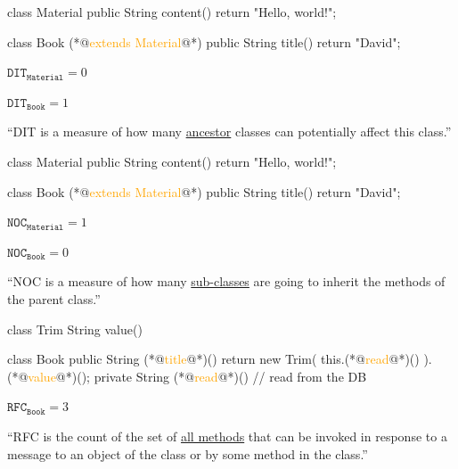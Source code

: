 \documentclass{article}
\begin{document}
\begin{multicols}{2}
{\small\begin{ffcode}
class Material {
  public String content() {
    return "Hello, world!";
  }
}

class Book (*@\textcolor{orange}{extends Material}@*) {
  public String title() {
    return "David";
  }
}
\end{ffcode}
}
\par\columnbreak\par
\(\texttt{DIT}_\texttt{Material} = 0\)\par
\(\texttt{DIT}_\texttt{Book} = 1\)\par
``DIT is a measure of how many \ul{ancestor} classes can potentially affect this class.''
\end{multicols}
\plush{}

\begin{multicols}{2}
{\small\begin{ffcode}
class Material {
  public String content() {
    return "Hello, world!";
  }
}

class Book (*@\textcolor{orange}{extends Material}@*) {
  public String title() {
    return "David";
  }
}
\end{ffcode}
}
\par\columnbreak\par
\(\texttt{NOC}_\texttt{Material} = 1\)\par
\(\texttt{NOC}_\texttt{Book} = 0\)\par
``NOC is a measure of how many \ul{sub-classes} are going to inherit the methods of the parent class.''
\end{multicols}
\plush{}

\begin{multicols}{2}
{\small\begin{ffcode}
class Trim
  String value()

class Book
  public String (*@\textcolor{orange}{title}@*)()
    return new Trim(
      this.(*@\textcolor{orange}{read}@*)()
    ).(*@\textcolor{orange}{value}@*)();
  private String (*@\textcolor{orange}{read}@*)()
    // read from the DB
\end{ffcode}
}
\par\columnbreak\par
\(\texttt{RFC}_\texttt{Book} = 3\)\par
``RFC is the count of the set of \ul{all methods} that can be invoked in response to a message to an object of the class or by some method in the class.''
\end{multicols}
\plush{}
\end{document}
